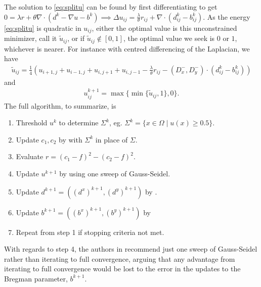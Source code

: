 The solution to \eqref{eq:splitu} can be found by first differentiating to get $0 = \lambda r  +\theta  \nabla \cdot ( d^k - \nabla u - b^k) \implies \Delta u_{ij} = \frac{\lambda}{\theta} r_{ij} + \nabla \cdot (d^k_{ij} - b^k_{ij})$. As the energy \eqref{eq:splitu} is quadratic in $u_{ij}$, either the optimal value is this unconstrained minimizer, call it $\widetilde u_{ij}$, or if $\widetilde{u}_{ij} \notin [0,1]$, the optimal value we seek is $0$ or $1$, whichever is nearer. For instance with centred differencing of the Laplacian, we have 
\begin{align}
\widetilde u_{ij} = \frac{1}{4}\left(
u_{i+1,j} + u_{i-1,j} + u_{i,j+1} + u_{i,j-1} 
- \frac{\lambda}{\theta} r_{ij}
-  (D^-_x, D^-_y) \cdot  (d^k_{ij} - b^k_{ij} )
\right) 
\label{eq:sbuij}
\end{align}
and 
\begin{align}
u_{ij}^{k+1}  = \max \{ \min\{ \widetilde u_{ij}, 1 \} , 0 \}.
\label{eq:sbuij2}
\end{align}
The full algorithm, to summarize, is
\begin{enumerate}
	\item Threshold $u^k$ to determine $\Sigma^k$, eg. $\Sigma^k = \{x\in\Omega \mid u(x) \geq 0.5 \}$.
	\item Update $c_1, c_2$ by  with $\Sigma^k$ in place of $\Sigma$.
	
	\item Evaluate $r = (c_1- f)^2 - (c_2 - f)^2$.

	\item Update $u^{k+1}$ by  using one sweep of Gauss-Seidel.
	
	\item Update $d^{k+1} = ((d^x)^{k+1}, (d^y)^{k+1})$ by .
	
	\item Update $b^{k+1} = ((b^x)^{k+1}, (b^y)^{k+1})$ by 
	
	\item Repeat from step 1 if stopping criteria not met.
\end{enumerate}
With regards to step 4, the authors in \cite{goldstein2010geometric} recommend just one sweep of Gauss-Seidel rather than iterating to full convergence, arguing that any advantage from iterating to full convergence would be lost to the error in the updates to the Bregman parameter, $b^{k+1}$.


